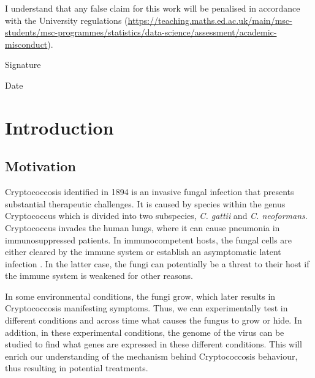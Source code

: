\documentclass[11pt,twoside]{article}
\numberwithin{Theorem}{section}
\numberwithin{Definition}{section}
\numberwithin{Lemma}{section}
\numberwithin{Algorithm}{section}
\numberwithin{equation}{section}
\newcommand{\dottedline}[1]{\makebox[#1]{.\dotfill}}
\begin{document}
I understand that any false claim for this work will be penalised in accordance with
the University regulations	(\url{https://teaching.maths.ed.ac.uk/main/msc-students/msc-programmes/statistics/data-science/assessment/academic-misconduct}).								

\vspace{1cm}

Signature \dottedline{8cm}

\vspace{5mm}

Date \dottedline{8cm}


\clearpage



\pagestyle{plain}
\setcounter{page}{1}

\tableofcontents
\clearpage
\listoffigures
\cleardoublepage

\setcounter{page}{1}

\nocite{*}
\clearpage

\section{Introduction}
\subsection{Motivation}
\label{sec:motivation}

Cryptococcosis identified in 1894 is an invasive fungal infection that presents substantial therapeutic challenges. It is caused by species within the genus Cryptococcus which is divided into two subspecies, \emph{C. gattii} and \emph{C. neoformans}. Cryptococcus invades the human lungs, where it can cause pneumonia in immunosuppressed patients. In immunocompetent hosts, the fungal cells are either cleared by the immune system or establish an asymptomatic latent infection \cite{may2016cryptococcus}. In the latter case, the fungi can potentially be a threat to their host if the immune system is weakened for other reasons. 

In some environmental conditions, the fungi grow, which later results in Cryptococcosis manifesting symptoms. Thus, we can experimentally test in different conditions and across time what causes the fungus to grow or hide. In addition, in these experimental conditions, the genome of the virus can be studied to find what genes are expressed in these different conditions. This will enrich our understanding of the mechanism behind Cryptococcosis behaviour, thus resulting in potential treatments.
\end{document}
